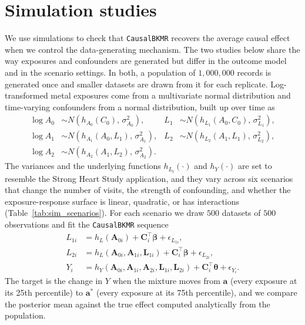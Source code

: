\documentclass[11pt]{article}
\newcommand{\pkg}[1]{\texttt{#1}}
\begin{document}
\section*{Simulation studies}
\label{sec:simulation}

We use simulations to check that \pkg{CausalBKMR} recovers the average causal effect when we control the data-generating mechanism. The two studies below share the way exposures and confounders are generated but differ in the outcome model and in the scenario settings. In both, a population of $1{,}000{,}000$ records is generated once and smaller datasets are drawn from it for each replicate. Log-transformed metal exposures come from a multivariate normal distribution and time-varying confounders from a normal distribution, built up over time as
\begin{align*}
    \log A_0 &\sim N\!\left(h_{A_0}(C_0),\, \sigma^2_{A_0}\right), &
    L_1 &\sim N\!\left(h_{L_1}(A_0, C_0),\, \sigma^2_{L_1}\right), \\
    \log A_1 &\sim N\!\left(h_{A_1}(A_0, L_1),\, \sigma^2_{A_1}\right), &
    L_2 &\sim N\!\left(h_{L_2}(A_1, L_1),\, \sigma^2_{L_2}\right), \\
    \log A_2 &\sim N\!\left(h_{A_2}(A_1, L_2),\, \sigma^2_{A_2}\right). &&
\end{align*}
The variances and the underlying functions $h_{L_t}(\cdot)$ and $h_{Y}(\cdot)$ are set to resemble the Strong Heart Study application, and they vary across six scenarios that change the number of visits, the strength of confounding, and whether the exposure-response surface is linear, quadratic, or has interactions (Table~\ref{tab:sim_scenarios}). For each scenario we draw $500$ datasets of $500$ observations and fit the \pkg{CausalBKMR} sequence
\begin{align}
    L_{1i} &= h_L(\mathbf{A}_{0i}) + \mathbf{C}_i^\top \boldsymbol{\beta} + \epsilon_{L_{1i}}, \label{eq:sim_L1} \\
    L_{2i} &= h_L(\mathbf{A}_{0i}, \mathbf{A}_{1i}, \mathbf{L}_{1i}) + \mathbf{C}_i^\top \boldsymbol{\beta} + \epsilon_{L_{2i}}, \label{eq:sim_L2} \\
    Y_i &= h_Y(\mathbf{A}_{0i}, \mathbf{A}_{1i}, \mathbf{A}_{2i}, \mathbf{L}_{1i}, \mathbf{L}_{2i}) + \mathbf{C}_i^\top \boldsymbol{\theta} + \epsilon_{Y_i}. \label{eq:sim_Y}
\end{align}
The target is the change in $Y$ when the mixture moves from $\mathbf{a}$ (every exposure at its 25th percentile) to $\mathbf{a}^*$ (every exposure at its 75th percentile), and we compare the posterior mean against the true effect computed analytically from the population.
\end{document}
